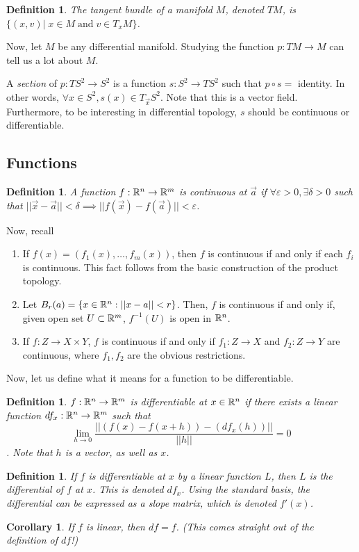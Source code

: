 \documentclass[11pt]{amsbook}
\theoremstyle{mystyle} \newtheorem{thrm}[thm]{Theorem}
\theoremstyle{mystyle} \newtheorem{defi}[thm]{Definition}
\theoremstyle{mystyle} \newtheorem{coro}[thm]{Corollary}
\theoremstyle{mystyle} \newtheorem{propo}[thm]{Proposition}
\theoremstyle{mystyle} \newtheorem{lemm}[thm]{Lemma}
\numberwithin{thm}{section}
\renewcommand{\epsilon}{\varepsilon}
\newcommand{\de}{\emph}
\begin{document}
\begin{defi}
	The \de{tangent bundle} of a manifold $M$, denoted $TM$, is $\{ (x,v) |\; x \in M \;\text{and}\; v \in T_xM \}$.
\end{defi}

Now, let $M$ be any differential manifold. Studying the function $p: TM \to M$
can tell us a lot about $M$.

\begin{example}
	A \de{section} of $p: TS^2 \to S^2$ is a function $s: S^2 \to TS^2$ such
	that $p \circ s =$ identity. In other words, $\forall x \in S^2, s(x) \in
	T_{\vec{x}}S^2$. Note that this is a vector field. Furthermore, to be
	interesting in differential topology, $s$ should be continuous or
	differentiable.
\end{example}



\subsection{Functions}

\begin{defi}
	A function $f: {\mathbb R}^n \to {\mathbb R}^m$ is continuous at $\vec{a}$ if $\forall
	\epsilon > 0, \exists \delta > 0$ such that $||\vec{x}-\vec{a}|| < \delta
	\implies ||f(\vec{x}) - f(\vec{a})|| < \epsilon$.
\end{defi}
Now, recall \begin{enumerate}
	\item If $f(x) = (f_1(x), \ldots, f_m(x))$, then $f$ is continuous if and
		only if each $f_i$ is continuous. This fact follows from the basic
		construction of the product topology.
	\item Let $B_r(a) = \{x \in {\mathbb R}^n : ||x-a|| < r\}$. Then, $f$ is continuous
		if and only if, given open set $U \subset {\mathbb R}^m$, $f^{-1}(U)$ is open in
		${\mathbb R}^n$.
	\item If $f: Z \to X \times Y$, $f$ is continuous if and only if $f_1: Z
		\to X$ and $f_2: Z \to Y$ are continuous, where $f_1, f_2$ are the
		obvious restrictions.
\end{enumerate}

Now, let us define what it means for a function to be differentiable.
\begin{defi}
	$f :{\mathbb R}^n \to {\mathbb R}^m$ is \de{differentiable} at $x \in {\mathbb R}^n$ if there exists a linear function $df_x : {\mathbb R}^n \to {\mathbb R}^m$  such that $$\lim_{h \to 0} \frac{|| (f(x)-f(x+h)) - (df_x(h)) ||}{||h||} = 0$$.  Note that $h$ is a vector, as well as $x$.
\end{defi}
\begin{defi}
	If $f$ is differentiable at $x$ by a linear function $L$, then $L$ is the \de{differential} of $f$ at $x$.  This is denoted $df_x$.  Using the standard basis, the differential can be expressed as a slope matrix, which is denoted $f'(x)$.
\end{defi}
\begin{coro}
	If $f$ is linear, then $df = f$.  (This comes straight out of the definition of $df$!)
\end{coro}
\end{document}

